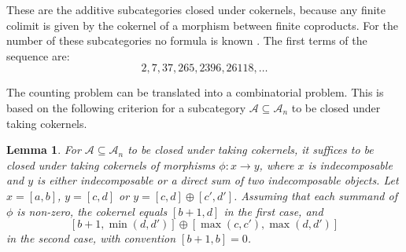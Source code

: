 \documentclass[a4paper]{amsart}
\theoremstyle{plain}
\newtheorem{lem}[thm]{Lemma}
\theoremstyle{definition}
\theoremstyle{remark}
\numberwithin{equation}{section}
\renewcommand{\min}{\operatorname{min}}
\def\A{\mathcal A}
\begin{document}
These are the additive subcategories closed under cokernels, because
any finite colimit is given by the cokernel of a morphism between
finite coproducts. For the number of these subcategories no formula is
known \cite{OEIS}. The first  terms of the sequence are:
\[ 2, 7, 37, 265, 2396, 26118,  \ldots \tag*{$\#(C)$}\]

The counting problem can be translated into a combinatorial
problem. This is based on the following criterion for a subcategory
$\A\subseteq\A_n$ to be closed under taking cokernels.

\begin{lem}\label{le:cok}
  For $\A \subseteq \A_n$ to be closed under taking cokernels, it
  suffices to be closed under taking cokernels of morphisms
  $\phi\colon x\to y$, where $x$ is indecomposable and $y$ is either
  indecomposable or a direct sum of two indecomposable objects.  Let
  $x=[a,b]$, $y=[c,d]$ or $y=[c,d]\oplus [c',d']$. Assuming that each
  summand of $\phi$ is non-zero, the cokernel equals $[b+1,d]$ in the
  first case, and
  \[[b+1,\min(d,d')] \oplus [\max(c,c'),\max(d,d')]\]
  in the second case, with convention $[b+1,b]=0$.
\end{lem}
\end{document}
